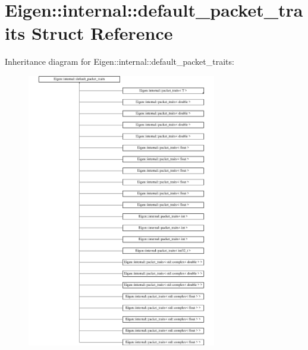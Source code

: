 \hypertarget{struct_eigen_1_1internal_1_1default__packet__traits}{}\section{Eigen\+::internal\+::default\+\_\+packet\+\_\+traits Struct Reference}
\label{struct_eigen_1_1internal_1_1default__packet__traits}
Inheritance diagram for Eigen\+::internal\+::default\+\_\+packet\+\_\+traits\+:\begin{figure}[H]
\begin{center}
\leavevmode
\includegraphics[height=12.000000cm]{struct_eigen_1_1internal_1_1default__packet__traits}
\end{center}
\end{figure}
